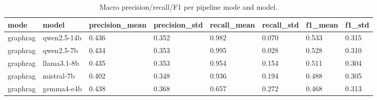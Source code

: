 \begin{table}[ht]
\centering
\caption{Macro precision/recall/F1 per pipeline mode and model.}
\label{tab:headline}
\begin{tabular}{llllllll}
\toprule
mode & model & precision\_mean & precision\_std & recall\_mean & recall\_std & f1\_mean & f1\_std \\
\midrule
graphrag & qwen2.5-14b & 0.436 & 0.352 & 0.982 & 0.070 & 0.533 & 0.315 \\
graphrag & qwen2.5-7b & 0.434 & 0.353 & 0.995 & 0.028 & 0.528 & 0.310 \\
graphrag & llama3.1-8b & 0.435 & 0.353 & 0.954 & 0.154 & 0.511 & 0.304 \\
graphrag & mistral-7b & 0.402 & 0.348 & 0.936 & 0.194 & 0.488 & 0.305 \\
graphrag & gemma4-e4b & 0.438 & 0.368 & 0.657 & 0.272 & 0.468 & 0.313 \\
\bottomrule
\end{tabular}
\end{table}
